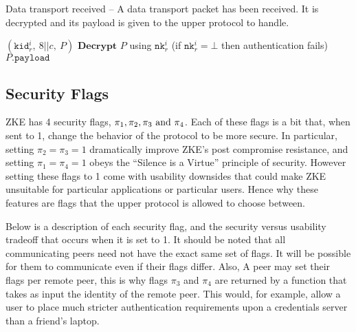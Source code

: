 \documentclass{article}
\begin{document}
\begin{algorithm}
	\caption{Data transport received -- A data transport packet has been received. It is decrypted and its payload is given to the upper protocol to handle.}
	\begin{algorithmic}
		\Require $(\texttt{kid}^i_r,\ 8||c,\ P)$
		\State $\textbf{Decrypt } P$ using $\texttt{nk}^i_r$ (if $\texttt{nk}^i_r=\bot$ then authentication fails)
		\Ensure $P\texttt{.payload}$
	\end{algorithmic}
\end{algorithm}

\subsection{Security Flags}\label{sec:security_flags}

ZKE has 4 security flags, $\pi_1, \pi_2, \pi_3 \text{ and } \pi_4$. Each of these flags is a bit that, when sent to 1, change the behavior of the protocol to be more secure. In particular, setting $\pi_2 = \pi_3 = 1$ dramatically improve ZKE's post compromise resistance, and setting $\pi_1 = \pi_4 = 1$ obeys the ``Silence is a Virtue'' principle of security. However setting these flags to 1 come with usability downsides that could make ZKE unsuitable for particular applications or particular users. Hence why these features are flags that the upper protocol is allowed to choose between.

Below is a description of each security flag, and the security versus usability tradeoff that occurs when it is set to 1. It should be noted that all communicating peers need not have the exact same set of flags. It will be possible for them to communicate even if their flags differ. Also, A peer may set their flags per remote peer, this is why flags $\pi_3$ and $\pi_4$ are returned by a function that takes as input the identity of the remote peer. This would, for example, allow a user to place much stricter authentication requirements upon a credentials server than a friend's laptop.
\end{document}
